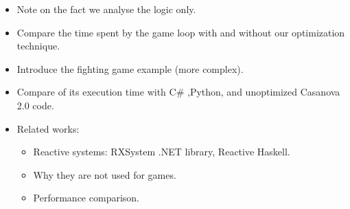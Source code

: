 \begin{itemize}
\item Note on the fact we analyse the logic only.
\item Compare the time spent by the game loop with and without our optimization technique.
\item Introduce the fighting game example (more complex).
\item Compare of its execution time with C\# ,Python, and unoptimized Casanova 2.0 code.
\item Related works:
	\begin{itemize}
	\item Reactive systems: RXSystem .NET library, Reactive Haskell.
	\item Why they are not used for games.
	\item Performance comparison.
	\end{itemize}
\end{itemize}